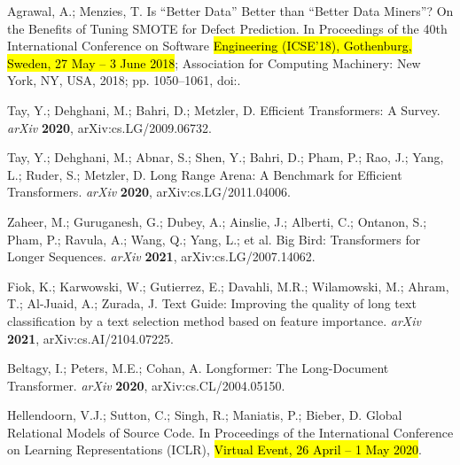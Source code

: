 \documentclass[mathematics,review,accept,moreauthors,pdftex]{Definitions/mdpi}
\begin{document}
\begin{thebibliography}{999}
Agrawal, A.; Menzies, T.
\newblock Is ``Better Data'' Better than ``Better Data Miners''? On the Benefits of
  Tuning SMOTE for Defect Prediction.
\newblock In Proceedings of the 40th International Conference on Software
  \hl{Engineering (ICSE'18), Gothenburg, Sweden, 27 May -- 3 June 2018}; Association for Computing Machinery: New York, NY, USA,  2018; pp. 1050–1061,
\newblock
  doi:{\href{https://doi.org/10.1145/3180155.3180197}{}}.

Tay, Y.; Dehghani, M.; Bahri, D.; Metzler, D.
\newblock Efficient Transformers: A Survey.  \emph{arXiv} \textbf{2020}, arXiv:cs.LG/2009.06732.

Tay, Y.; Dehghani, M.; Abnar, S.; Shen, Y.; Bahri, D.; Pham, P.; Rao, J.; Yang,
  L.; Ruder, S.; Metzler, D.
\newblock Long Range Arena: A Benchmark for Efficient Transformers. \emph{arXiv} \textbf{2020}, arXiv:cs.LG/2011.04006.

Zaheer, M.; Guruganesh, G.; Dubey, A.; Ainslie, J.; Alberti, C.; Ontanon, S.;
  Pham, P.; Ravula, A.; Wang, Q.; Yang, L.; et al.
\newblock Big Bird: Transformers for Longer Sequences. \emph{arXiv} \textbf{2021}, arXiv:cs.LG/2007.14062.

Fiok, K.; Karwowski, W.; Gutierrez, E.; Davahli, M.R.; Wilamowski, M.; Ahram,
  T.; Al-Juaid, A.; Zurada, J.
\newblock Text Guide: Improving the quality of long text classification by a
  text selection method based on feature importance. \emph{arXiv} \textbf{2021}, arXiv:cs.AI/2104.07225.

Beltagy, I.; Peters, M.E.; Cohan, A.
\newblock Longformer: The Long-Document Transformer. \emph{arXiv} \textbf{2020}, arXiv:cs.CL/2004.05150.

Hellendoorn, V.J.; Sutton, C.; Singh, R.; Maniatis, P.; Bieber, D.
\newblock Global Relational Models of Source Code.
\newblock In Proceedings of the International Conference on Learning Representations (ICLR),  \hl{Virtual Event, 26 April -- 1 May 2020}.


\end{thebibliography}
\end{document}
